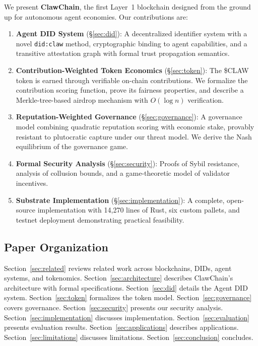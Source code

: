 \documentclass[conference]{IEEEtran}
\begin{document}
We present \textbf{ClawChain}, the first Layer~1 blockchain designed from the ground up for autonomous agent economies. Our contributions are:

\begin{enumerate}
    \item \textbf{Agent DID System} (\S\ref{sec:did}): A decentralized identifier system with a novel \texttt{did:claw} method, cryptographic binding to agent capabilities, and a transitive attestation graph with formal trust propagation semantics.
    
    \item \textbf{Contribution-Weighted Token Economics} (\S\ref{sec:token}): The \$CLAW token is earned through verifiable on-chain contributions. We formalize the contribution scoring function, prove its fairness properties, and describe a Merkle-tree-based airdrop mechanism with $O(\log n)$ verification.
    
    \item \textbf{Reputation-Weighted Governance} (\S\ref{sec:governance}): A governance model combining quadratic reputation scoring with economic stake, provably resistant to plutocratic capture under our threat model. We derive the Nash equilibrium of the governance game.
    
    \item \textbf{Formal Security Analysis} (\S\ref{sec:security}): Proofs of Sybil resistance, analysis of collusion bounds, and a game-theoretic model of validator incentives.
    
    \item \textbf{Substrate Implementation} (\S\ref{sec:implementation}): A complete, open-source implementation with 14,270 lines of Rust, six custom pallets, and testnet deployment demonstrating practical feasibility.
\end{enumerate}

\subsection{Paper Organization}

Section~\ref{sec:related} reviews related work across blockchains, DIDs, agent systems, and tokenomics. Section~\ref{sec:architecture} describes ClawChain's architecture with formal specifications. Section~\ref{sec:did} details the Agent DID system. Section~\ref{sec:token} formalizes the token model. Section~\ref{sec:governance} covers governance. Section~\ref{sec:security} presents our security analysis. Section~\ref{sec:implementation} discusses implementation. Section~\ref{sec:evaluation} presents evaluation results. Section~\ref{sec:applications} describes applications. Section~\ref{sec:limitations} discusses limitations. Section~\ref{sec:conclusion} concludes.
\end{document}
